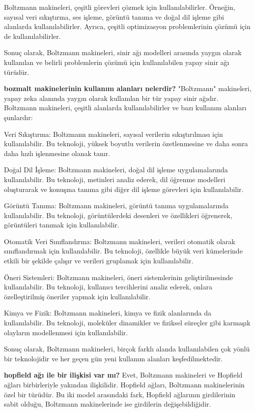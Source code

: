 \documentclass[11pt]{article}
\begin{document}
Boltzmann makineleri, çeşitli görevleri çözmek için kullanılabilirler. Örneğin, sayısal veri sıkıştırma, ses işleme, görüntü tanıma ve doğal dil işleme gibi alanlarda kullanılabilirler. Ayrıca, çeşitli optimizasyon problemlerinin çözümü için de kullanılabilirler.

Sonuç olarak, Boltzmann makineleri, sinir ağı modelleri arasında yaygın olarak kullanılan ve belirli problemlerin çözümü için kullanılabilen yapay sinir ağı türüdür.

\textbf{bozmalt makinelerinin kullanım alanları nelerdir?}
"Boltzmann" makineleri, yapay zeka alanında yaygın olarak kullanılan bir tür yapay sinir ağıdır. Boltzmann makineleri, çeşitli alanlarda kullanılabilirler ve bazı kullanım alanları şunlardır:

Veri Sıkıştırma: Boltzmann makineleri, sayısal verilerin sıkıştırılması için kullanılabilir. Bu teknoloji, yüksek boyutlu verilerin özetlenmesine ve daha sonra daha hızlı işlenmesine olanak tanır.

Doğal Dil İşleme: Boltzmann makineleri, doğal dil işleme uygulamalarında kullanılabilir. Bu teknoloji, metinleri analiz ederek, dil öğrenme modelleri oluşturarak ve konuşma tanıma gibi diğer dil işleme görevleri için kullanılabilir.

Görüntü Tanıma: Boltzmann makineleri, görüntü tanıma uygulamalarında kullanılabilir. Bu teknoloji, görüntülerdeki desenleri ve özellikleri öğrenerek, görüntüleri tanımak için kullanılabilir.

Otomatik Veri Sınıflandırma: Boltzmann makineleri, verileri otomatik olarak sınıflandırmak için kullanılabilir. Bu teknoloji, özellikle büyük veri kümelerinde etkili bir şekilde çalışır ve verileri gruplamak için kullanılabilir.

Öneri Sistemleri: Boltzmann makineleri, öneri sistemlerinin geliştirilmesinde kullanılabilir. Bu teknoloji, kullanıcı tercihlerini analiz ederek, onlara özelleştirilmiş öneriler yapmak için kullanılabilir.

Kimya ve Fizik: Boltzmann makineleri, kimya ve fizik alanlarında da kullanılabilir. Bu teknoloji, moleküler dinamikler ve fiziksel süreçler gibi karmaşık olayların modellenmesi için kullanılabilir.

Sonuç olarak, Boltzmann makineleri, birçok farklı alanda kullanılabilen çok yönlü bir teknolojidir ve her geçen gün yeni kullanım alanları keşfedilmektedir.

\textbf{hopfield ağı ile bir ilişkisi var mı?}
Evet, Boltzmann makineleri ve Hopfield ağları birbirleriyle yakından ilişkilidir. Hopfield ağları, Boltzmann makinelerinin özel bir türüdür. Bu iki model arasındaki fark, Hopfield ağlarının girdilerinin sabit olduğu, Boltzmann makinelerinde ise girdilerin değişebildiğidir.
\end{document}
